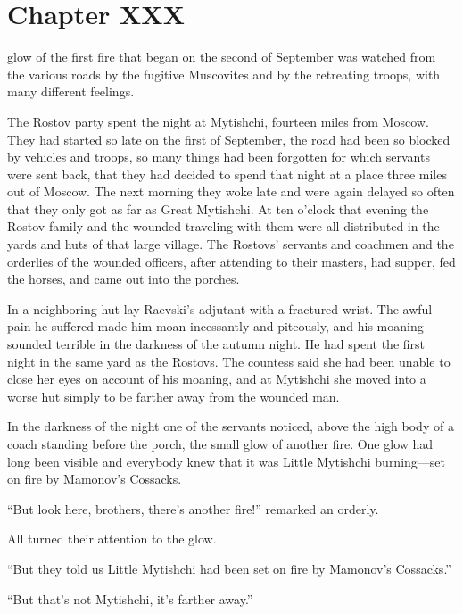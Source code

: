 \chapter*{Chapter XXX} \ifaudio {}
\fi

 glow of the first fire that began on the second of September
was watched from the various roads by the fugitive Muscovites and
by the retreating troops, with many different feelings.

The Rostov party spent the night at Mytishchi, fourteen miles
from Moscow. They had started so late on the first of September,
the road had been so blocked by vehicles and troops, so many
things had been forgotten for which servants were sent back, that
they had decided to spend that night at a place three miles out
of Moscow. The next morning they woke late and were again delayed
so often that they only got as far as Great Mytishchi. At ten
o'clock that evening the Rostov family and the wounded traveling
with them were all distributed in the yards and huts of that
large village. The Rostovs' servants and coachmen and the
orderlies of the wounded officers, after attending to their
masters, had supper, fed the horses, and came out into the
porches.

In a neighboring hut lay Raevski's adjutant with a fractured
wrist. The awful pain he suffered made him moan incessantly and
piteously, and his moaning sounded terrible in the darkness of
the autumn night. He had spent the first night in the same yard
as the Rostovs. The countess said she had been unable to close
her eyes on account of his moaning, and at Mytishchi she moved
into a worse hut simply to be farther away from the wounded man.

In the darkness of the night one of the servants noticed, above
the high body of a coach standing before the porch, the small
glow of another fire. One glow had long been visible and
everybody knew that it was Little Mytishchi burning---set on fire
by Mamonov's Cossacks.

``But look here, brothers, there's another fire!'' remarked an
orderly.

All turned their attention to the glow.

``But they told us Little Mytishchi had been set on fire by
Mamonov's Cossacks.''

``But that's not Mytishchi, it's farther away.''

